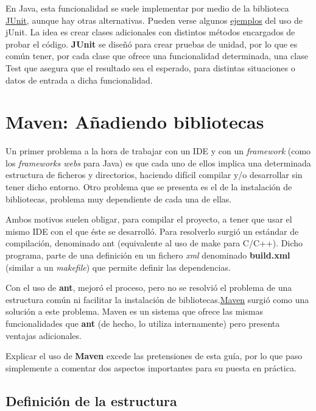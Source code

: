 \documentclass[11pt]{article}
\begin{document}
En Java, esta funcionalidad se suele implementar por medio de la biblioteca
\href{http://junit.sourceforge.net/}{JUnit}, aunque hay otras alternativas. Pueden verse algunos
\href{http://www.slideshare.net/tom.zimmermann/unit-testing-with-junit}{ejemplos} del uso de jUnit. La idea es crear clases adicionales con distintos métodos encargados de
probar el código. \textbf{JUnit} se diseñó para crear pruebas de unidad, por lo
que es común tener, por cada clase que ofrece una funcionalidad determinada, una clase
Test que asegura que el resultado sea el esperado, para distintas
situaciones o datos de entrada a dicha funcionalidad.


\section{Maven: Añadiendo bibliotecas} \label{sec-5} \label{maven}

Un primer problema a la hora de trabajar con un IDE y con un \emph{framework}
(como los \emph{frameworks webs} para Java) es que cada uno de ellos implica una
determinada estructura de ficheros y directorios, haciendo difícil compilar y/o
desarrollar sin tener dicho entorno. Otro problema que se presenta es el de la instalación de bibliotecas, problema muy dependiente de cada una de ellas.

Ambos motivos suelen obligar, para compilar el proyecto, a tener que usar el mismo IDE con el que éste se desarrolló. Para resolverlo surgió un estándar de compilación,
denominado \textsf{ant} (equivalente al uso de \textsf{make} para C/C++). Dicho
programa, parte de una definición en un fichero \emph{xml} denominado
\textbf{build.xml} (similar a un \textit{makefile}) que permite definir las dependencias.

Con el uso de \textbf{ant}, mejoró el proceso, pero no se resolvió el problema
de una estructura común ni facilitar la instalación de bibliotecas.\href{http://maven.apache.org/}{Maven} surgió como una solución a este problema. Maven es un sistema que ofrece las mismas funcionalidades que \textbf{ant} (de hecho, lo utiliza internamente) pero presenta ventajas adicionales.

Explicar el uso de \textbf{Maven} excede las pretensiones de esta guía, por lo
que paso simplemente a comentar dos aspectos importantes para su puesta en práctica.


\subsection{Definición de la estructura} \label{sec-5-1}
\end{document}
